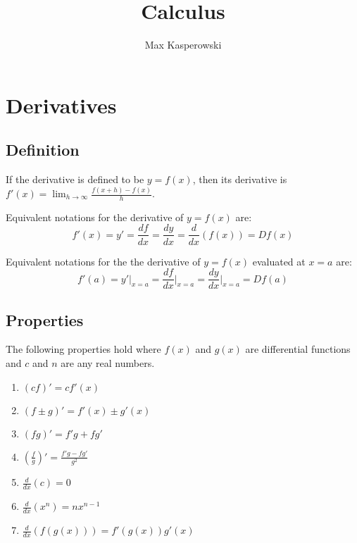 \documentclass[a4paper, 10pt]{article}
\title{Calculus}
\author{Max Kasperowski}
\begin{document}
\maketitle
\tableofcontents

\newpage
\section{Derivatives}
\subsection{Definition}

If the derivative is defined to be \( y = f(x) \), then its derivative is \( f'(x) = \lim_{h\to\infty}\frac{f(x+h)-f(x)}{h} \).
\newline

Equivalent notations for the derivative of \( y = f(x) \) are:
\[ f'(x) = y' = \frac{df}{dx} = \frac{dy}{dx} = \frac{d}{dx}(f(x)) = Df(x) \]
\newline

Equivalent notations for the the derivative of \( y = f(x) \) evaluated at \( x = a \) are:
\[ f'(a) = y'\Bigr|_{x=a} = \frac{df}{dx}\Bigr|_{x=a} = \frac{dy}{dx}\Bigr|_{x=a} = Df(a) \]

\subsection{Properties}
The following properties hold where \( f(x) \) and \( g(x) \) are differential functions and \( c \) and \( n \) are any real numbers.

\begin{multicols}{2}
    \begin{enumerate}
        \item \( (cf)' = cf'(x) \)
        \item \( (f \pm g)' = f'(x) \pm g'(x) \)
        \item \( (fg)' = f'g + fg' \)
        \item \( \left(\frac{f}{g}\right)' = \frac{f'g - fg'}{g^2} \)
        \item \( \frac{d}{dx}(c) = 0 \)
        \item \( \frac{d}{dx}\left(x^n\right) = nx^{n-1} \)
        \item \( \frac{d}{dx}\left(f\left(g(x)\right)\right) = f'\left(g(x)\right)g'(x) \)
    \end{enumerate}
\end{multicols}
\end{document}
